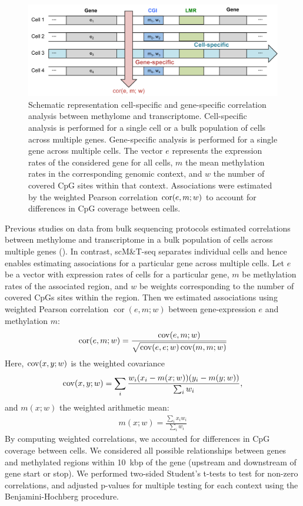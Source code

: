 \begin{figure}[htbp!]
\centering
\includegraphics[width=1.0\textwidth]{method}
\caption[Schematic representation cell-specific and gene-specific correlation analysis between methylome and transcriptome.]{Schematic representation cell-specific and gene-specific correlation analysis between methylome and transcriptome. Cell-specific analysis is performed for a single cell or a bulk population of cells across multiple genes. Gene-specific analysis is performed for a single gene across multiple cells. The vector $e$ represents the expression rates of the considered gene for all cells, $m$ the mean methylation rates in the corresponding genomic context, and $w$ the number of covered CpG sites within that context. Associations were estimated by the weighted Pearson correlation $\operatorname{cor}(e, m; w)$ to account for differences in CpG coverage between cells.}
\label{fig:mt_method}
\end{figure}

Previous studies on data from bulk sequencing protocols estimated correlations between methylome and transcriptome in a bulk population of cells across multiple genes (). In contrast, scM\&T-seq separates individual cells and hence enables estimating associations for a particular gene across multiple cells. Let $e$ be a vector with expression rates of cells for a particular gene, $m$ be methylation rates of the associated region, and $w$ be weights corresponding to the number of covered CpGs sites within the region. Then we estimated associations using weighted Pearson correlation $\operatorname{cor}(e,m;w)$ between gene-expression $e$ and methylation $m$:
\begin{align} \label{eq:mt_wcor}
  \operatorname{cor}(e,m;w)=\frac{\operatorname{cov}(e,m;w)}{\sqrt{\operatorname{cov}(e,e;w)\operatorname{cov}(m,m;w)}}
\end{align}
Here, $\operatorname{cov}(x,y;w)$ is the weighted covariance
\begin{align}
  \operatorname{cov}(x,y;w)=\sum_i \frac{w_i (x_i-m(x;w))(y_i-m(y;w))}{\sum_i w_i },
\end{align}
and $m(x;w)$ the weighted arithmetic mean:
\begin{align}
  m(x;w)=\frac{\sum_i x_i w_i}{\sum_i w_i}
\end{align}
By computing weighted correlations, we accounted for differences in CpG coverage between cells. We considered all possible relationships between genes and methylated regions within 10~kbp of the gene (upstream and downstream of gene start or stop). We performed two-sided Student's t-tests to test for non-zero correlations, and adjusted p-values for multiple testing for each context using the Benjamini-Hochberg procedure.

